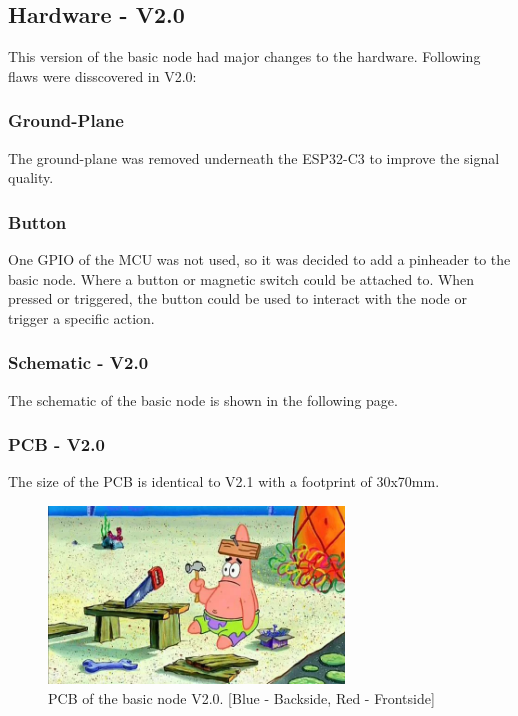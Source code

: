 \subsection{Hardware - V2.0}

    This version of the basic node had major changes to the hardware. Following flaws
    were disscovered in V2.0:

    \subsubsection{Ground-Plane}
        The ground-plane was removed underneath the ESP32-C3 to improve the
        signal quality. 

    \subsubsection{Button}
        One GPIO of the MCU was not used, so it was decided to add a pinheader to the basic node.
        Where a button or magnetic switch could be attached to. When pressed or triggered, the
        button could be used to interact with the node or trigger a specific action.

    \subsubsection{Schematic - V2.0}
        The schematic of the basic node is shown in the following page.
        

    \subsubsection{PCB - V2.0}
        The size of the PCB is identical to V2.1 with a footprint of 30x70mm.
        
    \begin{figure}[H]
        \centering
        \includegraphics[width=0.7\textwidth]{assets/HW/TBD.png}
        \caption{PCB of the basic node V2.0. [Blue - Backside, Red - Frontside]}
    \end{figure}
